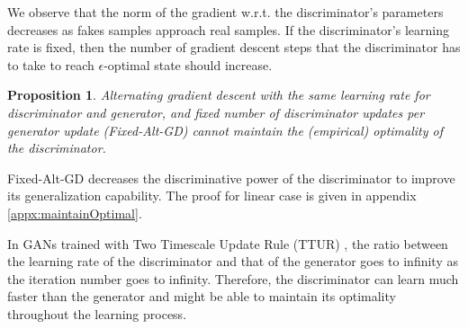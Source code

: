 \documentclass{article} %
\newtheorem{proposition}{Proposition}
\begin{document}
We observe that the norm of the gradient w.r.t. the discriminator's parameters decreases as fakes samples approach real samples. If the discriminator's learning rate is fixed, then the number of gradient descent steps that the discriminator has to take to reach $\epsilon$-optimal state should increase. 
\begin{proposition}
Alternating gradient descent with the same learning rate for discriminator and generator, and fixed number of discriminator updates per generator update (Fixed-Alt-GD) cannot maintain the (empirical) optimality of the discriminator. 
\end{proposition}
Fixed-Alt-GD decreases the discriminative power of the discriminator to improve its generalization capability. The proof for linear case is given in appendix \ref{appx:maintainOptimal}. 

In GANs trained with Two Timescale Update Rule (TTUR) \citep{ttur}, the ratio between the learning rate of the discriminator and that of the generator goes to infinity as the iteration number goes to infinity. Therefore, the discriminator can learn much faster than the generator and might be able to maintain its optimality throughout the learning process.

\end{document}
